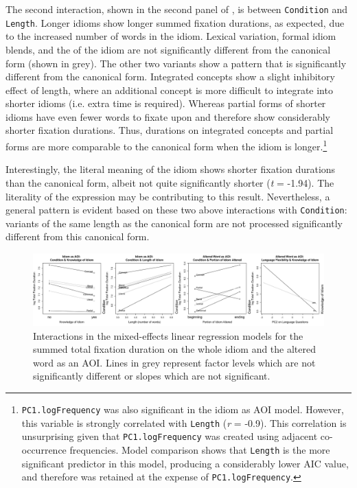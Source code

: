 \documentclass[output=paper
,modfonts
,nonflat]{langsci/langscibook}
\begin{document}
The second interaction, shown in the second panel of , is between \texttt{Condition} and \texttt{Length}. Longer idioms show longer summed fixation durations, as expected, due to the increased number of words in the idiom. Lexical variation, formal idiom blends, and the  of the idiom are not significantly different from the canonical form (shown in grey). The other two variants show a pattern that is significantly different from the canonical form. Integrated concepts show a slight inhibitory effect of length, where an additional concept is more difficult to integrate into shorter idioms (i.e. extra time is required). Whereas partial forms of shorter idioms have even fewer words to fixate upon and therefore show considerably shorter fixation durations. Thus, durations on integrated concepts and partial forms are more comparable to the canonical form when the idiom is longer.\footnote{\texttt{PC1.logFrequency} was also significant in the idiom as AOI model. However, this variable is strongly correlated with \texttt{Length} (\textit{r} = -0.9). This correlation is unsurprising given that \texttt{PC1.logFrequency} was created using adjacent co-occurrence frequencies. Model comparison shows that \texttt{Length} is the more significant predictor in this model, producing a considerably lower AIC value, and therefore was retained at the expense of \texttt{PC1.logFrequency}.}

Interestingly, the literal meaning of the idiom shows shorter fixation durations than the canonical form, albeit not quite significantly shorter (\textit{t} = -1.94). The literality of the expression \citep{TitoneConnine1994b} may be contributing to this result. Nevertheless, a general pattern is evident based on these two above interactions with \texttt{Condition}: variants of the same length as the canonical form are not processed significantly different from this canonical form.


\begin{figure}
\centering
\includegraphics[width=\textwidth]{figures/eyetracking.png}
\caption{Interactions in the mixed-effects linear regression models for the summed total fixation duration on the whole idiom and the altered word as an AOI. Lines in grey represent factor levels which are not significantly different or slopes which are not significant.}
\label{plotEyetracking}
\end{figure}
\end{document}
